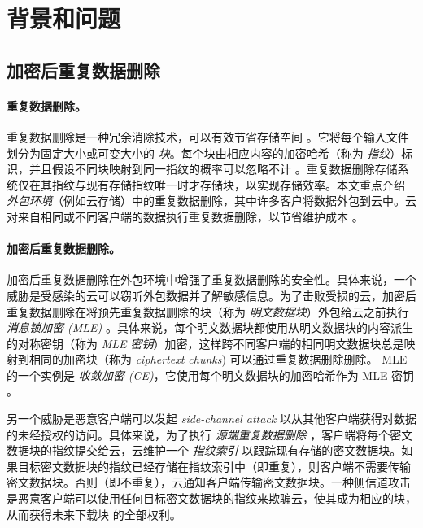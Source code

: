 \section{背景和问题}
\label{sec:featurespy-background}

\subsection{加密后重复数据删除}
\label{subsec:featurespy-basics}

\paragraph*{重复数据删除。}
重复数据删除是一种冗余消除技术，可以有效节省存储空间 \cite{wallace12, meyer11}。它将每个输入文件划分为固定大小或可变大小的 {\em 块}。每个块由相应内容的加密哈希（称为 {\em 指纹}）标识，并且假设不同块映射到同一指纹的概率可以忽略不计 \cite{black2006compare}。重复数据删除存储系统仅在其指纹与现有存储指纹唯一时才存储块，以实现存储效率。本文重点介绍 {\em 外包环境}（例如云存储）中的重复数据删除，其中许多客户将数据外包到云中。云对来自相同或不同客户端的数据执行重复数据删除，以节省维护成本 \cite{harnik10}。


\paragraph*{加密后重复数据删除。}
加密后重复数据删除在外包环境中增强了重复数据删除的安全性。具体来说，一个威胁是受感染的云可以窃听外包数据并了解敏感信息。为了击败受损的云，加密后重复数据删除在将预先重复数据删除的块（称为 {\em 明文数据块}）外包给云之前执行 {\em 消息锁加密 (MLE)} \cite{bellare2013MLE, bellare2013DupLESS}。具体来说，每个明文数据块都使用从明文数据块的内容派生的对称密钥（称为 {\em MLE 密钥}）加密，这样跨不同客户端的相同明文数据块总是映射到相同的加密块（称为 {\em ciphertext chunks}) 可以通过重复数据删除删除。 MLE 的一个实例是 {\em 收敛加密 (CE)}，它使用每个明文数据块的加密哈希作为 MLE 密钥 \cite{douceur02}。

另一个威胁是恶意客户端可以发起 {\em side-channel attack} \cite{harnik10, halevi11} 以从其他客户端获得对数据的未经授权的访问。具体来说，为了执行 {\em 源端重复数据删除} \cite{harnik10}，客户端将每个密文数据块的指纹提交给云，云维护一个 {\em 指纹索引} 以跟踪现有存储的密文数据块。如果目标密文数据块的指纹已经存储在指纹索引中（即重复），则客户端不需要传输密文数据块。否则（即不重复），云通知客户端传输密文数据块。一种侧信道攻击 \cite{mulazzani11, halevi11} 是恶意客户端可以使用任何目标密文数据块的指纹来欺骗云，使其成为相应的块，从而获得未来下载块 \cite{mulazzani11} 的全部权利。


